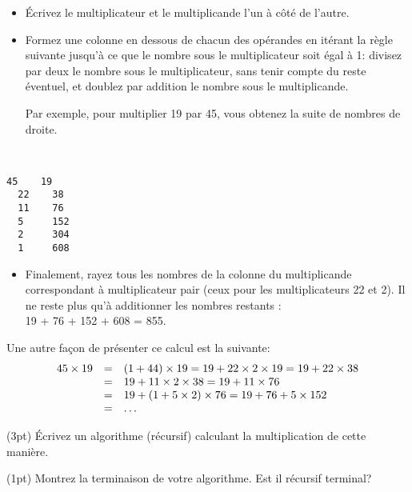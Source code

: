\documentclass[10pt]{article}\usepackage[correction,nu]{esial}
\begin{document}
\noindent\begin{minipage}{.87\linewidth}

\begin{itemize}
\item Écrivez le multiplicateur et le multiplicande l'un à côté de l'autre.
\item Formez une colonne en dessous de chacun des opérandes en itérant la règle
  suivante jusqu'à ce que le nombre sous le multiplicateur soit égal à 1:
  divisez par deux le nombre sous le multiplicateur, sans tenir compte du
  reste éventuel, et doublez par addition le nombre sous le multiplicande.

  Par exemple, pour multiplier 19 par 45, vous obtenez la suite de nombres
  de droite.
\end{itemize}
  
\end{minipage}~\begin{minipage}{.13\linewidth}
  \begin{Verbatim}[numbers=none]
  45    19
  22    38
  11    76
  5     152
  2     304
  1     608    
  \end{Verbatim}
\end{minipage}

\smallskip\noindent\begin{minipage}{\linewidth}
\begin{itemize}
\item Finalement, rayez tous les nombres de la colonne du multiplicande
  correspondant à multiplicateur pair (ceux pour les multiplicateurs 22 et 2).
  Il ne reste plus qu'à additionner les nombres restants :\\ 19 + 76 + 152 +
  608 = 855.
\end{itemize}  
\end{minipage}


\medskip\noindent
Une autre façon de présenter ce calcul est la suivante: 
$$
\begin{array}{l l l}
  45\times 19 &=& (1+44)\times 19 = 19 + 22\times 2\times 19 = 19 + 22 \times 38\\
  &=&19+11\times 2\times 38=19+11\times76\\
  &=&19+(1+5\times 2)\times76=19+76+5\times152\\
  &=&\ldots
\end{array}$$

\Question(3pt) Écrivez un algorithme (récursif) calculant la multiplication de
cette manière.

\Question(1pt) Montrez la terminaison de votre algorithme. Est il récursif
terminal?
\end{document}
